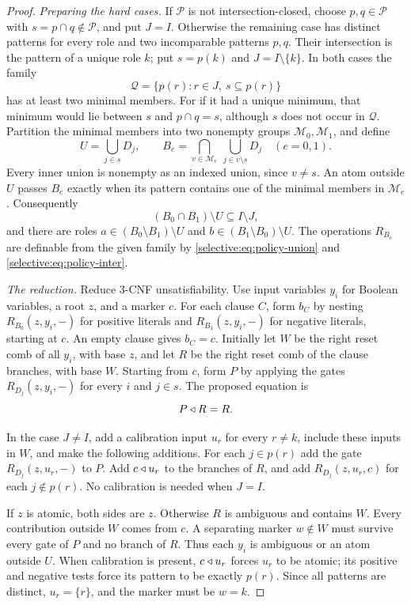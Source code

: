 \begin{proof}
\emph{Preparing the hard cases.}
If $\mathcal P$ is not intersection-closed, choose $p,q\in\mathcal P$
with $s=p\cap q\notin\mathcal P$, and put $J=I$.
Otherwise the remaining case has distinct patterns for every role
and two incomparable patterns $p,q$. Their intersection is the
pattern of a unique role $k$; put $s=p(k)$ and $J=I\setminus\{k\}$.
In both cases the family
\[
 \mathcal Q=\{p(r):r\in J,\ s\subseteq p(r)\}
\]
has at least two minimal members. For if it had a unique minimum,
that minimum would lie between $s$ and $p\cap q=s$, although $s$
does not occur in $\mathcal Q$.
Partition the minimal members into two nonempty groups
$\mathcal M_0,\mathcal M_1$, and define
\[
 U=\bigcup_{j\in s}D_j,\qquad
 B_e=\bigcap_{v\in\mathcal M_e}\ \bigcup_{j\in v\setminus s}D_j
 \quad(e=0,1).
\]
Every inner union is nonempty as an indexed union, since $v\ne s$.
An atom outside $U$ passes $B_e$ exactly when its pattern contains
one of the minimal members in $\mathcal M_e$.
Consequently
\[
 (B_0\cap B_1)\setminus U\subseteq I\setminus J,
\]
and there are roles
$a\in(B_0\setminus B_1)\setminus U$ and
$b\in(B_1\setminus B_0)\setminus U$.
The operations $R_{B_e}$ are definable from the given family by
\eqref{selective:eq:policy-union} and
\eqref{selective:eq:policy-inter}.

\emph{The reduction.}
Reduce 3-CNF unsatisfiability. Use input variables $y_i$ for Boolean
variables, a root $z$, and a marker $c$. For each clause $C$, form
$b_C$ by nesting $R_{B_0}(z,y_i,-)$ for positive literals and
$R_{B_1}(z,y_i,-)$ for negative literals, starting at $c$.
An empty clause gives $b_C=c$. Initially let $W$ be the right reset
comb of all $y_i$, with base $z$, and let $R$ be the right reset
comb of the clause branches, with base $W$.
Starting from $c$, form $P$ by applying the gates
$R_{D_j}(z,y_i,-)$ for every $i$ and $j\in s$.
The proposed equation is
\[
 P\mathbin{\triangleleft} R=R.
\]

In the case $J\ne I$, add a calibration input $u_r$ for every
$r\ne k$, include these inputs in $W$, and make the following
additions. For each $j\in p(r)$ add the gate
$R_{D_j}(z,u_r,-)$ to $P$. Add $c\mathbin{\triangleleft} u_r$ to the branches of $R$,
and add $R_{D_j}(z,u_r,c)$ for each $j\notin p(r)$.
No calibration is needed when $J=I$.

If $z$ is atomic, both sides are $z$. Otherwise $R$ is ambiguous
and contains $W$. Every contribution outside $W$ comes from $c$.
A separating marker $w\notin W$ must survive every gate of $P$
and no branch of $R$. Thus each $y_i$ is ambiguous or an atom
outside $U$. When calibration is present, $c\mathbin{\triangleleft} u_r$ forces
$u_r$ to be atomic; its positive and negative tests force its
pattern to be exactly $p(r)$. Since all patterns are distinct,
$u_r=\{r\}$, and the marker must be $w=k$.


\end{proof}
